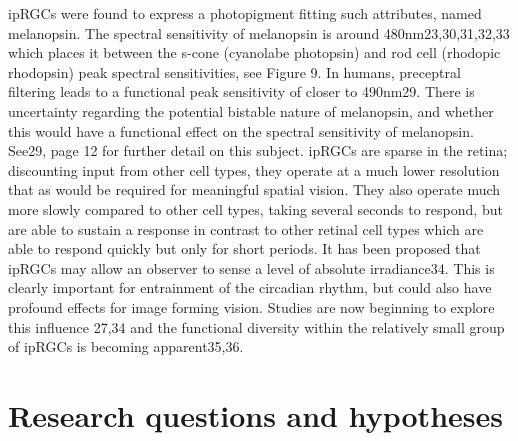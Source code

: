 ipRGCs were found to express a photopigment fitting such attributes, named melanopsin. The spectral sensitivity of melanopsin is around 480nm23,30,31,32,33 which places it between the s-cone (cyanolabe photopsin) and rod cell (rhodopic rhodopsin) peak spectral sensitivities, see Figure 9. In humans, preceptral filtering leads to a functional peak sensitivity of closer to 490nm29. There is uncertainty regarding the potential bistable nature of melanopsin, and whether this would have a functional effect on the spectral sensitivity of melanopsin. See29, page 12 for further detail on this subject.
ipRGCs are sparse in the retina; discounting input from other cell types, they operate at a much lower resolution that as would be required for meaningful spatial vision. They also operate much more slowly compared to other cell types, taking several seconds to respond, but are able to sustain a response in contrast to other retinal cell types which are able to respond quickly but only for short periods.
It has been proposed that ipRGCs may allow an observer to sense a level of absolute irradiance34. This is clearly important for entrainment of the circadian rhythm, but could also have profound effects for image forming vision. Studies are now beginning to explore this influence 27,34 and the functional diversity within the relatively small group of ipRGCs is becoming apparent35,36. 



\section{Research questions and hypotheses}
